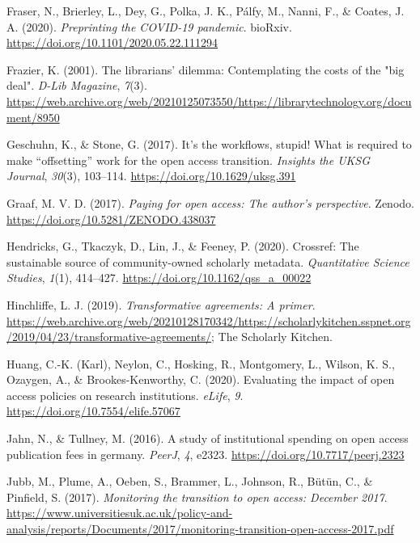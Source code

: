\documentclass[a4paper,man,floatsintext,longtable,noextraspace,12pt]{apa6}
\newlength{\cslhangindent}
\newenvironment{cslreferences}%
  {\setlength{\parindent}{0pt}%
  \everypar{\setlength{\hangindent}{\cslhangindent}}\ignorespaces}%
  {\par}
\begin{document}
\begin{cslreferences}
\leavevmode\hypertarget{ref-Fraser_2020}{}%
Fraser, N., Brierley, L., Dey, G., Polka, J. K., Pálfy, M., Nanni, F.,
\& Coates, J. A. (2020). \emph{Preprinting the COVID-19 pandemic}.
bioRxiv. \url{https://doi.org/10.1101/2020.05.22.111294}

\leavevmode\hypertarget{ref-Frazier_2001}{}%
Frazier, K. (2001). The librarians' dilemma: Contemplating the costs of
the "big deal". \emph{D-Lib Magazine}, \emph{7}(3).
\url{https://web.archive.org/web/20210125073550/https://librarytechnology.org/document/8950}

\leavevmode\hypertarget{ref-Geschuhn_2017}{}%
Geschuhn, K., \& Stone, G. (2017). It's the workflows, stupid! What is
required to make ``offsetting'' work for the open access transition.
\emph{Insights the UKSG Journal}, \emph{30}(3), 103--114.
\url{https://doi.org/10.1629/uksg.391}

\leavevmode\hypertarget{ref-Graaf_2017}{}%
Graaf, M. V. D. (2017). \emph{Paying for open access: The author's
perspective}. Zenodo. \url{https://doi.org/10.5281/ZENODO.438037}

\leavevmode\hypertarget{ref-Hendricks_2020}{}%
Hendricks, G., Tkaczyk, D., Lin, J., \& Feeney, P. (2020). Crossref: The
sustainable source of community-owned scholarly metadata.
\emph{Quantitative Science Studies}, \emph{1}(1), 414--427.
\url{https://doi.org/10.1162/qss_a_00022}

\leavevmode\hypertarget{ref-Hinchliffe_2019}{}%
Hinchliffe, L. J. (2019). \emph{Transformative agreements: A primer}.
\url{https://web.archive.org/web/20210128170342/https://scholarlykitchen.sspnet.org/2019/04/23/transformative-agreements/};
The Scholarly Kitchen.

\leavevmode\hypertarget{ref-Huang_2020}{}%
Huang, C.-K. (Karl), Neylon, C., Hosking, R., Montgomery, L., Wilson, K.
S., Ozaygen, A., \& Brookes-Kenworthy, C. (2020). Evaluating the impact
of open access policies on research institutions. \emph{eLife},
\emph{9}. \url{https://doi.org/10.7554/elife.57067}

\leavevmode\hypertarget{ref-Jahn_2016}{}%
Jahn, N., \& Tullney, M. (2016). A study of institutional spending on
open access publication fees in germany. \emph{PeerJ}, \emph{4}, e2323.
\url{https://doi.org/10.7717/peerj.2323}

\leavevmode\hypertarget{ref-Jubb_2017}{}%
Jubb, M., Plume, A., Oeben, S., Brammer, L., Johnson, R., Bütün, C., \&
Pinfield, S. (2017). \emph{Monitoring the transition to open access:
December 2017}.
\url{https://www.universitiesuk.ac.uk/policy-and-analysis/reports/Documents/2017/monitoring-transition-open-access-2017.pdf}


\end{cslreferences}
\end{document}
